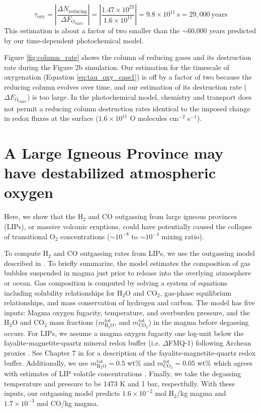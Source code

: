 \documentclass[9pt,twoside,lineno]{pnas-new}
\begin{document}
\begin{equation} \label{eq:tau_oxy_case1}
    \tau_\text{oxy} = \left| \frac{\Delta N_\text{reducing}}{\Delta F_\mathrm{O_{equiv}}} \right| = \left|\frac{1.47 \times 10^{23}} {1.6 \times 10^{11}} \right| = 9.8 \times 10^{11} \: \text{s} = 29,000 \: \text{years}
\end{equation}
This estimation is about a factor of two smaller than the $\sim$60,000 years predicted by our time-dependent photochemical model. 

Figure \ref{fig:column_rate} shows the column of reducing gases and its destruction rate during the Figure 2b simulation. Our estimation for the timescale of oxygenation (Equation \eqref{eq:tau_oxy_case1}) is off by a factor of two because the reducing column evolves over time, and our estimation of its destruction rate ($\Delta F_\mathrm{O_{equiv}}$) is too large. In the photochemical model, chemistry and transport does not permit a reducing column destruction rates identical to the imposed change in redox fluxes at the surface ($1.6 \times 10^{11}$ O molecules cm$^{-2}$ s$^{-1}$).

\section*{A Large Igneous Province may have destabilized atmospheric oxygen}


Here, we show that the H$_2$ and CO outgassing from large igneous provinces (LIPs), or massive volcanic eruptions, could have potentially caused the collapse of transitional O$_2$ concentrations ($\sim 10^{-8}$ to $\sim 10^{-4}$ mixing ratio). 

To compute H$_2$ and CO outgassing rates from LIPs, we use the outgassing model described in \cite{Wogan_2020}. To briefly summarize, the model estimates the composition of gas bubbles suspended in magma just prior to release into the overlying atmosphere or ocean. Gas composition is computed by solving a system of equations including solubility relationships for H$_2$O and CO$_2$, gas-phase equilibrium relationships, and mass conservation of hydrogen and carbon. The model has five inputs: Magma oxygen fugacity, temperature, and overburden pressure, and the H$_2$O and CO$_2$ mass fractions ($m_\mathrm{H_2O}^\mathrm{tot}$, and $m_\mathrm{CO_2}^\mathrm{tot}$) in the magma before degassing occurs. For LIPs, we assume a magma oxygen fugacity one log-unit below the fayalite-magnetite-quartz mineral redox buffer (i.e. $\Delta$FMQ-1) following Archean proxies \cite{Aulbach_2016}. See Chapter 7 in \cite{Catling_2017} for a description of the fayalite-magnetite-quartz redox buffer. Additionally, we use $m_\mathrm{H_2O}^\mathrm{tot} = 0.5$ wt\% and $m_\mathrm{CO_2}^\mathrm{tot} = 0.05$ wt\% which agrees with estimates of LIP volatile concentrations \cite{Wallace_2015}. Finally, we take the degassing temperature and pressure to be 1473 K and 1 bar, respectfully. With these inputs, our outgassing model predicts $1.6 \times 10^{-2}$ mol H$_2$/kg magma and $1.7 \times 10^{-3}$ mol CO/kg magma. 
\end{document}
